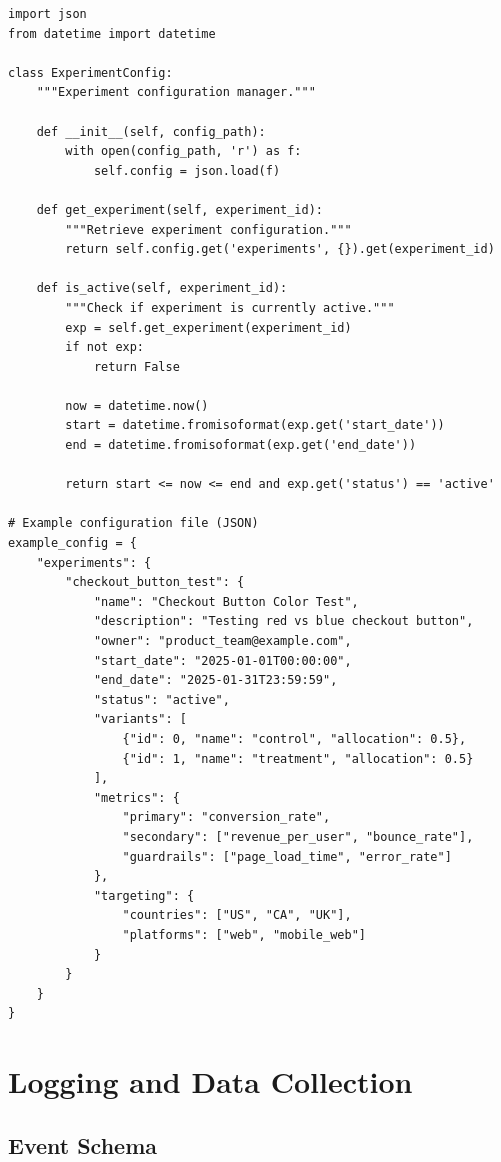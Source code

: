 \lstset{language=Python, caption=Experiment Configuration Schema}
\begin{lstlisting}
import json
from datetime import datetime

class ExperimentConfig:
    """Experiment configuration manager."""

    def __init__(self, config_path):
        with open(config_path, 'r') as f:
            self.config = json.load(f)

    def get_experiment(self, experiment_id):
        """Retrieve experiment configuration."""
        return self.config.get('experiments', {}).get(experiment_id)

    def is_active(self, experiment_id):
        """Check if experiment is currently active."""
        exp = self.get_experiment(experiment_id)
        if not exp:
            return False

        now = datetime.now()
        start = datetime.fromisoformat(exp.get('start_date'))
        end = datetime.fromisoformat(exp.get('end_date'))

        return start <= now <= end and exp.get('status') == 'active'

# Example configuration file (JSON)
example_config = {
    "experiments": {
        "checkout_button_test": {
            "name": "Checkout Button Color Test",
            "description": "Testing red vs blue checkout button",
            "owner": "product_team@example.com",
            "start_date": "2025-01-01T00:00:00",
            "end_date": "2025-01-31T23:59:59",
            "status": "active",
            "variants": [
                {"id": 0, "name": "control", "allocation": 0.5},
                {"id": 1, "name": "treatment", "allocation": 0.5}
            ],
            "metrics": {
                "primary": "conversion_rate",
                "secondary": ["revenue_per_user", "bounce_rate"],
                "guardrails": ["page_load_time", "error_rate"]
            },
            "targeting": {
                "countries": ["US", "CA", "UK"],
                "platforms": ["web", "mobile_web"]
            }
        }
    }
}
\end{lstlisting}

\section{Logging and Data Collection}

\subsection{Event Schema}

